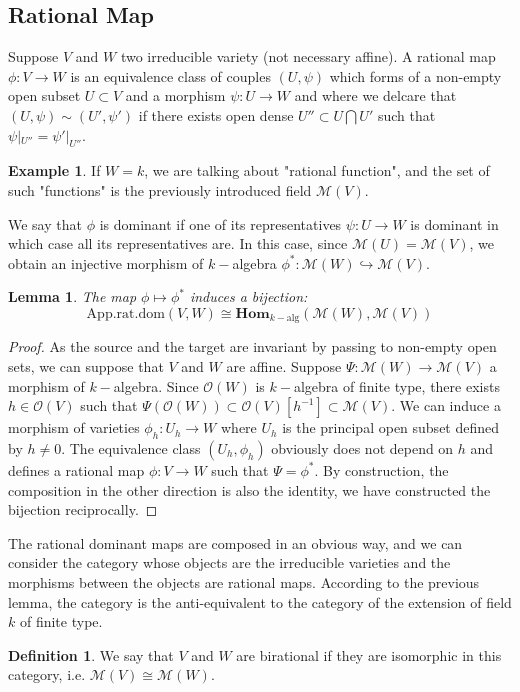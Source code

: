 \documentclass[12pt,a4paper,english]{article}
\theoremstyle{plain}
\newtheorem{lem}[thm]{Lemma}
\theoremstyle{definition}
\newtheorem{defi}{Definition}
\newtheorem*{example}{Example}
\theoremstyle{remark}
\newcommand{\homo}{\mathbf{Hom}}
\begin{document}
\subsection{Rational Map}
Suppose $V$ and $W$ two irreducible variety (not necessary affine). A rational map $\phi:V\rightarrow W$ is an equivalence class of couples $(U,\psi) $ which forms of a non-empty open subset $U\subset V$ and a morphism $\psi:U\rightarrow W$ and where we delcare that $(U,\psi)\sim(U',\psi')$ if there exists open dense $U''\subset U\bigcap U'$ such that $\psi|_{U''}=\psi'|_{U''}$.
\begin{example}
If $W=k$, we are talking about "rational function", and the set of such "functions" is the previously introduced field $\mathcal{M}(V)$.
\end{example}
We say that $\phi$ is dominant if one of its representatives $\psi:U\rightarrow W$ is dominant in which case all its representatives are. In this case, since $\mathcal{M}(U)=\mathcal{M}(V)$, we obtain an injective morphism of $k-$algebra $\phi^{*}:\mathcal{M}(W)\hookrightarrow\mathcal{M}(V)$. 
\begin{lem}
The map $\phi\mapsto\phi^{*}$ induces a bijection:
\begin{equation*}
    \text{App.rat.dom}(V,W)\cong \homo_{k-\text{alg}}(\mathcal{M}(W),\mathcal{M}(V))
\end{equation*}
\end{lem}
\begin{proof}
As the source and the target are invariant by passing to non-empty open sets, we can suppose that $V$ and $W$ are affine. Suppose $\Psi:\mathcal{M}(W)\rightarrow\mathcal{M}(V)$ a morphism of $k-$algebra. Since $\mathcal{O}(W)$ is $k-$algebra of finite type, there exists $h\in\mathcal{O}(V)$ such that $\Psi(\mathcal{O}(W))\subset \mathcal{O}(V)[h^{-1}]\subset \mathcal{M}(V)$. We can induce a morphism of varieties $\phi_{h}:U_{h}\rightarrow W$ where $U_{h}$ is the principal open subset defined by $h\not=0$. The equivalence class $(U_{h},\phi_{h})$ obviously does not depend on $h$ and defines a rational map $\phi:V\rightarrow W$ such that $\Psi=\phi^{*}$. By construction, the composition in the other direction is also the identity, we have constructed the bijection reciprocally.   
\end{proof}
The rational dominant maps are composed in an obvious way, and we can consider the category whose objects are the irreducible varieties and the morphisms between the objects are rational maps. According to the previous lemma, the category is the anti-equivalent to the category of the extension of field $k$ of finite type. 
\begin{defi}
We say that $V$ and $W$ are birational if they are isomorphic in this category, i.e. $\mathcal{M}(V)\cong\mathcal{M}(W)$.
\end{defi}
\end{document}
